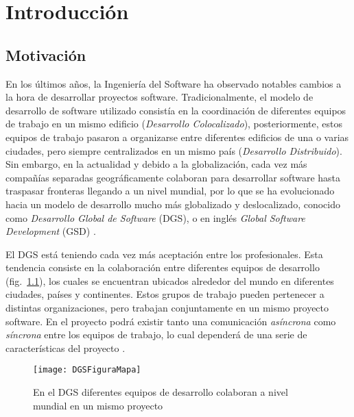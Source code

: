 \chapter{Introducción}
\label{cap:Introduccion}

\section{Motivación}
\label{sec:Motivacion}
En los últimos años, la Ingeniería del Software ha observado notables cambios a la hora de desarrollar proyectos software. Tradicionalmente, el modelo de desarrollo de software utilizado consistía en la coordinación de diferentes equipos de trabajo en un mismo edificio (\emph{Desarrollo Colocalizado}), posteriormente, estos equipos de trabajo pasaron a organizarse entre diferentes edificios de una o varias ciudades, pero siempre centralizados en un mismo país (\emph{Desarrollo Distribuido}). Sin embargo, en la actualidad y debido a la globalización, cada vez más compañías separadas geográficamente colaboran para desarrollar software hasta traspasar fronteras llegando a un nivel mundial, por lo que se ha evolucionado hacia un modelo de desarrollo mucho más globalizado y deslocalizado, conocido como \emph{Desarrollo Global de Software} (DGS), o en inglés \emph{Global Software Development} (GSD) \cite{piattini2014desarrollo}.

El DGS está teniendo cada vez más aceptación entre los profesionales. Esta tendencia consiste en la colaboración entre diferentes equipos de desarrollo (fig.~\ref{fig:DGSFiguraMapa}), los cuales se encuentran ubicados alrededor del mundo en diferentes ciudades, países y continentes. Estos grupos de trabajo pueden pertenecer a distintas organizaciones, pero trabajan conjuntamente en un mismo proyecto software. En el proyecto podrá existir tanto una comunicación \emph{asíncrona} como \emph{síncrona} entre los equipos de trabajo, lo cual dependerá de una serie de características del proyecto \cite{prikladnicki2008improving}. 

\begin{figure}[htb]
	\centering
	\texttt{[image: DGSFiguraMapa]}
	\caption[Colaboración mundial en el DGS]{En el DGS diferentes equipos de desarrollo colaboran a nivel mundial en un mismo proyecto}
	\label{fig:DGSFiguraMapa}
\end{figure} 

